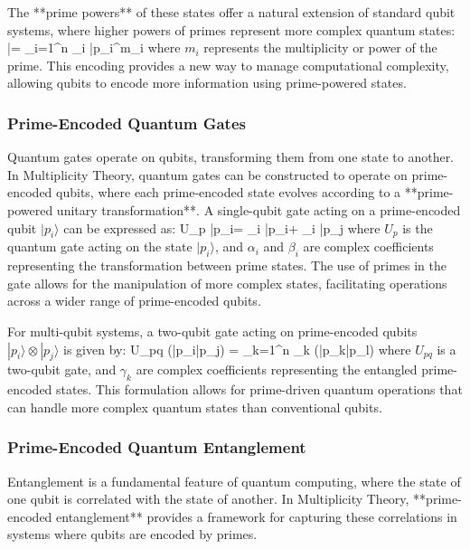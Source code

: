 \documentclass[12pt]{article}
\begin{document}
The **prime powers** of these states offer a natural extension of standard qubit systems, where higher powers of primes represent more complex quantum states:
\]
|\psi\rangle = \sum_{i=1}^{n} \alpha_i |p_i^{m_i}\rangle
\]
where \( m_i \) represents the multiplicity or power of the prime. This encoding provides a new way to manage computational complexity, allowing qubits to encode more information using prime-powered states.

\subsubsection{Prime-Encoded Quantum Gates}

Quantum gates operate on qubits, transforming them from one state to another. In Multiplicity Theory, quantum gates can be constructed to operate on prime-encoded qubits, where each prime-encoded state evolves according to a **prime-powered unitary transformation**. A single-qubit gate acting on a prime-encoded qubit \( |p_i\rangle \) can be expressed as:
\]
U_p |p_i\rangle = \alpha_i |p_i\rangle + \beta_i |p_j\rangle
\]
where \( U_p \) is the quantum gate acting on the state \( |p_i\rangle \), and \( \alpha_i \) and \( \beta_i \) are complex coefficients representing the transformation between prime states. The use of primes in the gate allows for the manipulation of more complex states, facilitating operations across a wider range of prime-encoded qubits.

For multi-qubit systems, a two-qubit gate acting on prime-encoded qubits \( |p_i\rangle \otimes |p_j\rangle \) is given by:
\]
U_{pq} (|p_i\rangle \otimes |p_j\rangle) = \sum_{k=1}^{n} \gamma_k (|p_k\rangle \otimes |p_l\rangle)
\]
where \( U_{pq} \) is a two-qubit gate, and \( \gamma_k \) are complex coefficients representing the entangled prime-encoded states. This formulation allows for prime-driven quantum operations that can handle more complex quantum states than conventional qubits.

\subsubsection{Prime-Encoded Quantum Entanglement}

Entanglement is a fundamental feature of quantum computing, where the state of one qubit is correlated with the state of another. In Multiplicity Theory, **prime-encoded entanglement** provides a framework for capturing these correlations in systems where qubits are encoded by primes.
\end{document}
